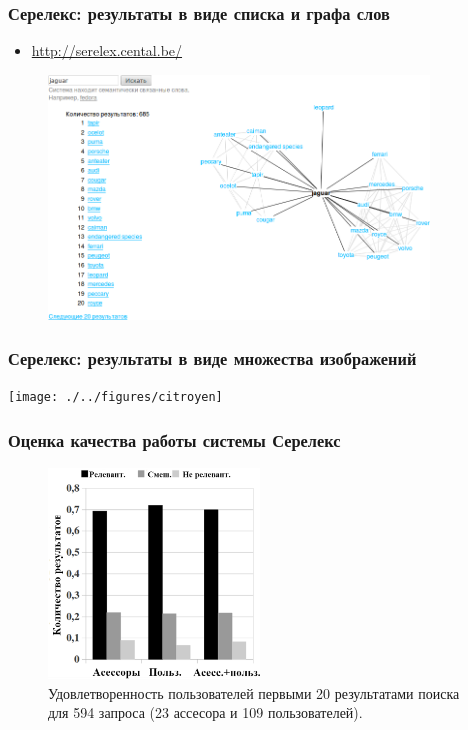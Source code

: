 \documentclass{beamer}
\begin{document}
\begin{frame}
\frametitle{Серелекс: результаты в виде списка и графа слов}

\begin{itemize}
\item \url{http://serelex.cental.be/}
\end{itemize}


\begin{figure}	
	\centering
	\includegraphics[width=0.9\textwidth]{jaguar}
\end{figure}

\end{frame}



\begin{frame}
\frametitle{Серелекс: результаты в виде множества изображений}

\texttt{[image: ./../figures/citroyen]}

\end{frame}

\begin{frame}
\frametitle{Оценка качества работы системы Серелекс}

\begin{figure}
\center
\includegraphics[width=0.5\textwidth]{serelex-eval}

\caption{Удовлетворенность пользователей первыми 20 результатами поиска для
594 запроса (23 ассесора и 109 пользователей).}
\end{figure}
\end{frame}
\end{document}
